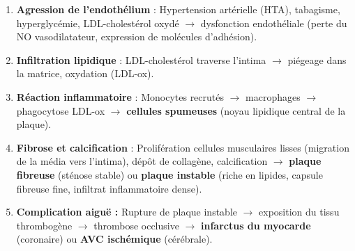 \documentclass[11pt]{article}
\begin{document}
\begin{methode}
\begin{enumerate}
    \item \textbf{Agression de l'endothélium} : Hypertension artérielle (HTA), tabagisme, hyperglycémie, LDL-cholestérol oxydé $\rightarrow$ dysfonction endothéliale (perte du NO vasodilatateur, expression de molécules d'adhésion).
    \item \textbf{Infiltration lipidique} : LDL-cholestérol traverse l'intima $\rightarrow$ piégeage dans la matrice, oxydation (LDL-ox).
    \item \textbf{Réaction inflammatoire} : Monocytes recrutés $\rightarrow$ macrophages $\rightarrow$ phagocytose LDL-ox $\rightarrow$ \textbf{cellules spumeuses} (noyau lipidique central de la plaque).
    \item \textbf{Fibrose et calcification} : Prolifération cellules musculaires lisses (migration de la média vers l'intima), dépôt de collagène, calcification $\rightarrow$ \textbf{plaque fibreuse} (sténose stable) ou \textbf{plaque instable} (riche en lipides, capsule fibreuse fine, infiltrat inflammatoire dense).
    \item \textbf{Complication aiguë :} Rupture de plaque instable $\rightarrow$ exposition du tissu thrombogène $\rightarrow$ thrombose occlusive $\rightarrow$ \textbf{infarctus du myocarde} (coronaire) ou \textbf{AVC ischémique} (cérébrale).
\end{enumerate}
\end{methode}
\end{document}
